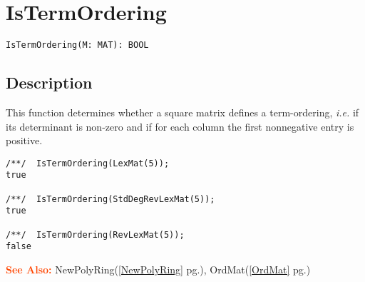 \documentclass[a4paper]{mybook}
\newenvironment{command}{}{} %
\newcommand\SeeAlso{\par\textcolor{OrangeRed}{\textbf{\large See Also: }}}
\begin{document}
\section{IsTermOrdering}
\label{IsTermOrdering}
\begin{command} %


\begin{Verbatim}[label=syntax, rulecolor=\color{MidnightBlue},
frame=single]
IsTermOrdering(M: MAT): BOOL
\end{Verbatim}


\subsection*{Description}

This function determines whether a square matrix defines a term-ordering,
\textit{i.e.} if its determinant is non-zero and if for each column the first
nonnegative entry is positive.
\begin{Verbatim}[label=example, rulecolor=\color{PineGreen}, frame=single]
/**/  IsTermOrdering(LexMat(5));
true

/**/  IsTermOrdering(StdDegRevLexMat(5));
true

/**/  IsTermOrdering(RevLexMat(5));
false
\end{Verbatim}


\SeeAlso %
  NewPolyRing(\ref{NewPolyRing} pg.\pageref{NewPolyRing}), 
    OrdMat(\ref{OrdMat} pg.\pageref{OrdMat})
\end{command} %
\end{document}
